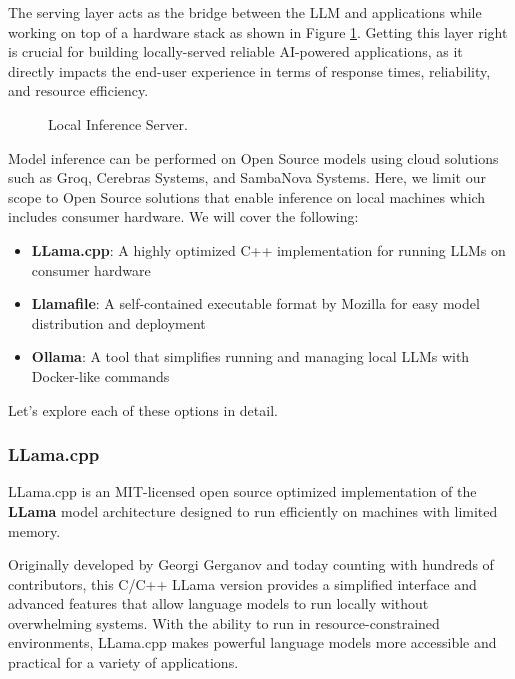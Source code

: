 The serving layer acts as the bridge between the LLM and applications while working on top of a hardware stack as shown in Figure \ref{fig:local_inference}. Getting this layer right is crucial for building locally-served reliable AI-powered applications, as it directly impacts the end-user experience in terms of response times, reliability, and resource efficiency.

\begin{figure}[H]
\centering

\caption{Local Inference Server.}
\label{fig:local_inference}
\end{figure}

Model inference can be performed on Open Source models using cloud solutions such as Groq, Cerebras Systems, and SambaNova Systems. Here, we limit our scope to Open Source solutions that enable inference on local machines which includes consumer hardware. We will cover the following:

\begin{itemize}
    \item \textbf{LLama.cpp}: A highly optimized C++ implementation for running LLMs on consumer hardware
    \item \textbf{Llamafile}: A self-contained executable format by Mozilla for easy model distribution and deployment
    \item \textbf{Ollama}: A tool that simplifies running and managing local LLMs with Docker-like commands
\end{itemize}

Let's explore each of these options in detail.

\subsubsection{LLama.cpp}

LLama.cpp  is an MIT-licensed open source optimized implementation of the \textbf{LLama} model architecture designed to run efficiently on machines with limited memory.

Originally developed by Georgi Gerganov and today counting with hundreds of contributors, this C/C++ LLama version provides a simplified interface and advanced features that allow language models to run locally without overwhelming systems. With the ability to run in resource-constrained environments, LLama.cpp makes powerful language models more accessible and practical for a variety of applications.

